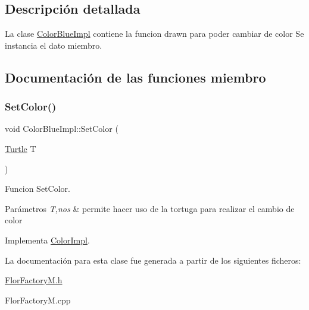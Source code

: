 \subsection{Descripción detallada}
La clase \hyperlink{classColorBlueImpl}{Color\+Blue\+Impl} contiene la funcion drawn para poder cambiar de color  Se instancia el dato miembro. 

\subsection{Documentación de las funciones miembro}
\mbox{\label{classColorBlueImpl_aa18a3e0b37de1bafbd4954fc73df7462}} 
\subsubsection{\texorpdfstring{Set\+Color()}{SetColor()}}
{\footnotesize\ttfamily void Color\+Blue\+Impl\+::\+Set\+Color (\begin{DoxyParamCaption}\item[{\hyperlink{classTurtle}{Turtle}}]{T }\end{DoxyParamCaption})\hspace{0.3cm}{\ttfamily [virtual]}}

Funcion Set\+Color. 
\begin{DoxyParams}{Parámetros}
{\em T,nos} & permite hacer uso de la tortuga para realizar el cambio de color \\
\hline
\end{DoxyParams}


Implementa \hyperlink{classColorImpl_a25bf353d46c94dc280eced8d7d566825}{Color\+Impl}.



La documentación para esta clase fue generada a partir de los siguientes ficheros\+:\begin{DoxyCompactItemize}
\item 
\hyperlink{FlorFactoryM_8h}{Flor\+Factory\+M.\+h}\item 
Flor\+Factory\+M.\+cpp\end{DoxyCompactItemize}
